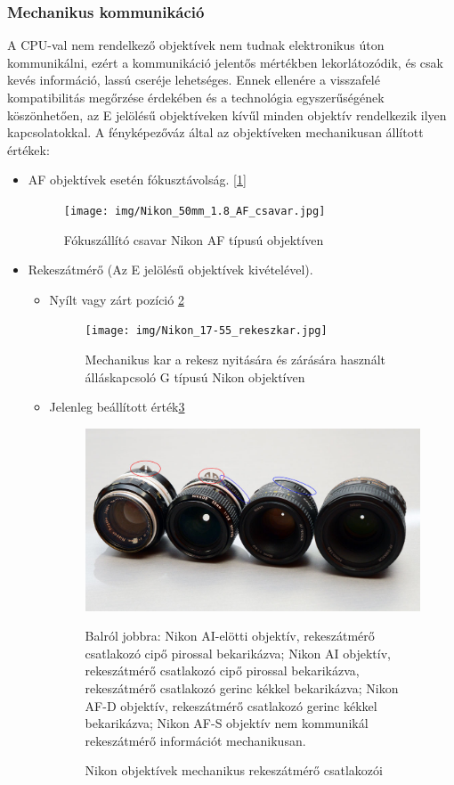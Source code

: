 \subsubsection{Mechanikus kommunikáció}
A CPU-val nem rendelkező objektívek nem tudnak elektronikus úton kommunikálni, ezért a kommunikáció jelentős mértékben lekorlátozódik, és csak kevés információ, lassú cseréje lehetséges. Ennek ellenére a visszafelé kompatibilitás megőrzése érdekében és a technológia egyszerűségének köszönhetően, az E jelölésű objektíveken kívűl minden objektív rendelkezik ilyen kapcsolatokkal.
A fényképezőváz által az objektíveken mechanikusan állított értékek:
\begin{itemize}
    \item AF objektívek esetén fókusztávolság. [\ref{fig:AF_csavar}]
    \begin{figure}[H]
    	\centering
    	\texttt{[image: img/Nikon\_50mm\_1.8\_AF\_csavar.jpg]}
    	\caption{Fókuszállító csavar Nikon AF típusú objektíven}
    	\label{fig:AF_csavar}
    \end{figure}
    \item Rekeszátmérő (Az E jelölésű objektívek kivételével).
    \begin{itemize}
        \item Nyílt vagy zárt pozíció \ref{fig:G_rekeszkar}
        \begin{figure}[H]
        	\centering
        	\texttt{[image: img/Nikon\_17-55\_rekeszkar.jpg]}
        	\caption{Mechanikus kar a rekesz nyitására és zárására használt álláskapcsoló G típusú Nikon objektíven}
        	\label{fig:G_rekeszkar}
        \end{figure}
        \item Jelenleg beállított érték\ref{fig:Exposure_coupleing}
        \begin{figure}[H]
        	\centering
        	\includegraphics[width=0.75\linewidth]{img/lenses-AI-and-non-AI.jpg}
        	\caption{Nikon objektívek mechanikus rekeszátmérő csatlakozói \cite{Legacy_lenses}}
            \medskip
            \Centering
            \small Balról jobbra: Nikon AI-elötti objektív, rekeszátmérő csatlakozó cipő pirossal bekarikázva; Nikon AI objektív,  rekeszátmérő csatlakozó cipő pirossal bekarikázva, rekeszátmérő csatlakozó gerinc kékkel bekarikázva; Nikon AF-D objektív, rekeszátmérő csatlakozó gerinc kékkel bekarikázva; Nikon AF-S objektív nem kommunikál rekeszátmérő információt mechanikusan.\cite{Legacy_lenses}
        	\label{fig:Exposure_coupleing}
        \end{figure}
    \end{itemize}
\end{itemize}

